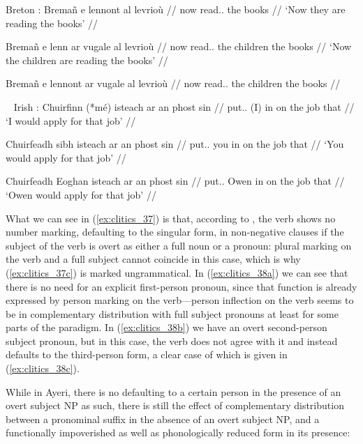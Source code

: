 \pex\label{ex:clitics_37}
Breton \parencites[145]{spencerluis2012}[from][]{borsleyetal2007}:
\a\label{ex:clitics_37a}
\begingl
	\gla Bremañ e lennont al levrioù //
	\glb now \Prt{} read.\Prs{}.\Tpl{} the books //
	\glft `Now they are reading the books' //
\endgl

\a\label{ex:clitics_37b}\begingl
	\gla Bremañ e lenn ar vugale al levrioù //
	\glb now \Prt{} read.\Prs{}.\Tsg{} the children the books //
	\glft `Now the children are reading the books' //
\endgl

\a\label{ex:clitics_37c}\ljudge{*}\begingl
	\gla Bremañ e lennont ar vugale al levrioù //
	\glb now \Prt{} read.\Prs{}.\Tpl{} the children the books //
\endgl
\xe

\pex~\label{ex:clitics_38}
Irish \parencites[145]{spencerluis2012}[from][]{mccloskeyhale1984}:
\a\label{ex:clitics_38a}
\begingl
	\gla Chuirfinn (*mé) isteach ar an phost sin //
	\glb put.\Cond{}.\Fsg{} (​I​) in on the job that //
	\glft `I would apply for that job' //
\endgl

\a\label{ex:clitics_38b}\begingl
	\gla Chuirfeadh sibh isteach ar an phost sin //
	\glb put.\Cond{}.\Tsg{} you in on the job that //
	\glft `You would apply for that job' //
\endgl

\a\label{ex:clitics_38c}\begingl
	\gla Chuirfeadh Eoghan isteach ar an phost sin //
	\glb put.\Cond{}.\Tsg{} Owen in on the job that //
	\glft `Owen would apply for that job' //
\endgl
\xe

What we can see in (\ref{ex:clitics_37}) is that, according to
\citet{spencerluis2012}, the verb shows no number marking, defaulting to the
singular form, in non-negative clauses if the subject of the verb is overt as
either a full noun or a pronoun: plural marking on the verb and a full subject
cannot coincide in this case, which is why (\ref{ex:clitics_37c}) is marked
ungrammatical. In (\ref{ex:clitics_38a}) we can see that there is no need for
an explicit first-person pronoun, since that function is already expressed by
person marking on the verb—person inflection on the verb seems to be in
complementary distribution with full subject pronouns at least for some parts
of the paradigm. In (\ref{ex:clitics_38b}) we have an overt second-person
subject pronoun, but in this case, the verb does not agree with it and instead
defaults to the third-person form, a clear case of which is given in
(\ref{ex:clitics_38c}).

While in Ayeri, there is no defaulting to a certain person in the presence of
an overt subject NP as such, there is still the effect of complementary
distribution between a pronominal suffix in the absence of an overt subject NP,
and a functionally impoverished as well as phonologically reduced form in its
presence:

